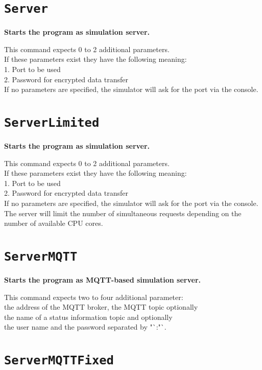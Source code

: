 \section{\texttt{Server}}

\textbf{Starts the program as simulation server.}

This command expects 0 to 2 additional parameters.\\
If these parameters exist they have the following meaning:\\
1. Port to be used\\
2. Password for encrypted data transfer\\
If no parameters are specified, the simulator will ask for the port via the console.

\section{\texttt{ServerLimited}}

\textbf{Starts the program as simulation server.}

This command expects 0 to 2 additional parameters.\\
If these parameters exist they have the following meaning:\\
1. Port to be used\\
2. Password for encrypted data transfer\\
If no parameters are specified, the simulator will ask for the port via the console.\\
The server will limit the number of simultaneous requests depending on the\\
number of available CPU cores.

\section{\texttt{ServerMQTT}}

\textbf{Starts the program as MQTT-based simulation server.}

This command expects two to four additional parameter:\\
the address of the MQTT broker, the MQTT topic optionally\\
the name of a status information topic and optionally\\
the user name and the password separated by "`:"`.

\section{\texttt{ServerMQTTFixed}}

